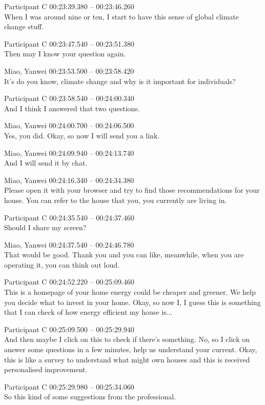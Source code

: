 {Participant C 00:23:39.380 -- 00:23:46.260 \\
When I was around nine or ten, I start to have this sense of global climate change stuff.

Participant C 00:23:47.540 -- 00:23:51.380 \\
Then may I know your question again.

Miao, Yanwei 00:23:53.500 -- 00:23:58.420 \\
It's do you know, climate change and why is it important for individuals?

Participant C 00:23:58.540 -- 00:24:00.340 \\
And I think I answered that two questions.

Miao, Yanwei 00:24:00.700 -- 00:24:06.500 \\
Yes, you did. Okay, so now I will send you a link.

Miao, Yanwei 00:24:09.940 -- 00:24:13.740 \\
And I will send it by chat.

Miao, Yanwei 00:24:16.340 -- 00:24:34.380 \\
Please open it with your browser and try to find those recommendations for your house. You can refer to the house that you, you currently are living in.

Participant C 00:24:35.540 -- 00:24:37.460 \\
Should I share my screen?

Miao, Yanwei 00:24:37.540 -- 00:24:46.780 \\
That would be good. Thank you and you can like, meanwhile, when you are operating it, you can think out loud.

Participant C 00:24:52.220 -- 00:25:09.460 \\
This is a homepage of your home energy could be cheaper and greener. We help you decide what to invest in your home. Okay, so now I, I guess this is something that I can check of how energy efficient my house is...

Participant C 00:25:09.500 -- 00:25:29.940 \\
And then maybe I click on this to check if there's something. No, so I click on answer some questions in a few minutes, help us understand your current. Okay, this is like a survey to understand what might own houses and this is received personalised improvement.

Participant C 00:25:29.980 -- 00:25:34.060 \\
So this kind of some suggestions from the professional.

}
